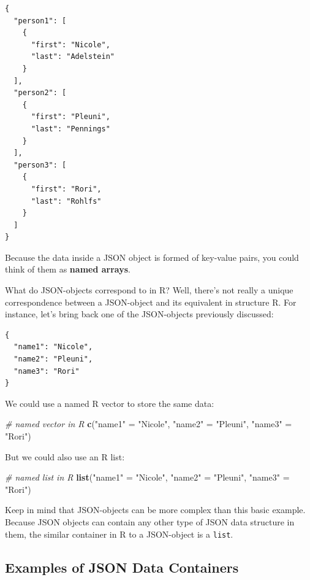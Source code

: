 \documentclass[
]{book}
\newenvironment{Shaded}{\begin{snugshade}}{\end{snugshade}}
\newcommand{\CommentTok}[1]{\textcolor[rgb]{0.56,0.35,0.01}{\textit{#1}}}
\newcommand{\FunctionTok}[1]{\textcolor[rgb]{0.13,0.29,0.53}{\textbf{#1}}}
\newcommand{\NormalTok}[1]{#1}
\newcommand{\OtherTok}[1]{\textcolor[rgb]{0.56,0.35,0.01}{#1}}
\newcommand{\StringTok}[1]{\textcolor[rgb]{0.31,0.60,0.02}{#1}}
\begin{document}
\begin{verbatim}
{
  "person1": [
    {
      "first": "Nicole",
      "last": "Adelstein"
    }
  ],
  "person2": [
    {
      "first": "Pleuni",
      "last": "Pennings"
    }
  ],
  "person3": [
    {
      "first": "Rori",
      "last": "Rohlfs"
    }
  ]
}
\end{verbatim}

Because the data inside a JSON object is formed of key-value pairs, you could
think of them as \textbf{named arrays}.

What do JSON-objects correspond to in R? Well, there's not really a unique
correspondence between a JSON-object and its equivalent in structure R. For
instance, let's bring back one of the JSON-objects previously discussed:

\begin{verbatim}
{
  "name1": "Nicole",
  "name2": "Pleuni",
  "name3": "Rori"
}
\end{verbatim}

We could use a named R vector to store the same data:

\begin{Shaded}
\begin{Highlighting}[]
\CommentTok{\# named vector in R}
\FunctionTok{c}\NormalTok{(}\StringTok{"name1"} \OtherTok{=} \StringTok{"Nicole"}\NormalTok{, }\StringTok{"name2"} \OtherTok{=} \StringTok{"Pleuni"}\NormalTok{, }\StringTok{"name3"} \OtherTok{=} \StringTok{"Rori"}\NormalTok{)}
\end{Highlighting}
\end{Shaded}

But we could also use an R list:

\begin{Shaded}
\begin{Highlighting}[]
\CommentTok{\# named list in R}
\FunctionTok{list}\NormalTok{(}\StringTok{"name1"} \OtherTok{=} \StringTok{"Nicole"}\NormalTok{, }\StringTok{"name2"} \OtherTok{=} \StringTok{"Pleuni"}\NormalTok{, }\StringTok{"name3"} \OtherTok{=} \StringTok{"Rori"}\NormalTok{)}
\end{Highlighting}
\end{Shaded}

Keep in mind that JSON-objects can be more complex than this basic example.
Because JSON objects can contain any other type of JSON data structure in them,
the similar container in R to a JSON-object is a \texttt{list}.

\hypertarget{examples-of-json-data-containers}{%
\subsection{Examples of JSON Data Containers}\label{examples-of-json-data-containers}}
\end{document}
